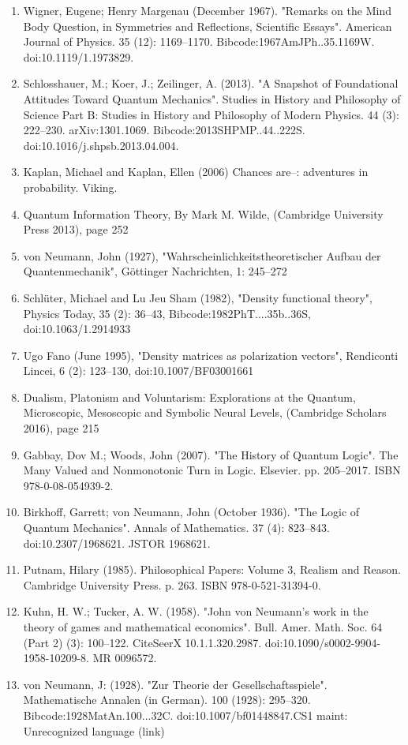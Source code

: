 \begin{enumerate}
\item Wigner, Eugene; Henry Margenau (December 1967). "Remarks on the Mind Body Question, in Symmetries and Reflections, Scientific Essays". American Journal of Physics. 35 (12): 1169–1170. Bibcode:1967AmJPh..35.1169W. doi:10.1119/1.1973829.
\item Schlosshauer, M.; Koer, J.; Zeilinger, A. (2013). "A Snapshot of Foundational Attitudes Toward Quantum Mechanics". Studies in History and Philosophy of Science Part B: Studies in History and Philosophy of Modern Physics. 44 (3): 222–230. arXiv:1301.1069. Bibcode:2013SHPMP..44..222S. doi:10.1016/j.shpsb.2013.04.004.
\item Kaplan, Michael and Kaplan, Ellen (2006) Chances are–: adventures in probability. Viking.
\item Quantum Information Theory, By Mark M. Wilde, (Cambridge University Press 2013), page 252
\item von Neumann, John (1927), "Wahrscheinlichkeitstheoretischer Aufbau der Quantenmechanik", Göttinger Nachrichten, 1: 245–272
\item Schlüter, Michael and Lu Jeu Sham (1982), "Density functional theory", Physics Today, 35 (2): 36–43, Bibcode:1982PhT....35b..36S, doi:10.1063/1.2914933
\item Ugo Fano (June 1995), "Density matrices as polarization vectors", Rendiconti Lincei, 6 (2): 123–130, doi:10.1007/BF03001661
\item Dualism, Platonism and Voluntarism: Explorations at the Quantum, Microscopic, Mesoscopic and Symbolic Neural Levels, (Cambridge Scholars 2016), page 215
\item Gabbay, Dov M.; Woods, John (2007). "The History of Quantum Logic". The Many Valued and Nonmonotonic Turn in Logic. Elsevier. pp. 205–2017. ISBN 978-0-08-054939-2.
\item Birkhoff, Garrett; von Neumann, John (October 1936). "The Logic of Quantum Mechanics". Annals of Mathematics. 37 (4): 823–843. doi:10.2307/1968621. JSTOR 1968621.
\item Putnam, Hilary (1985). Philosophical Papers: Volume 3, Realism and Reason. Cambridge University Press. p. 263. ISBN 978-0-521-31394-0.
\item Kuhn, H. W.; Tucker, A. W. (1958). "John von Neumann's work in the theory of games and mathematical economics". Bull. Amer. Math. Soc. 64 (Part 2) (3): 100–122. CiteSeerX 10.1.1.320.2987. doi:10.1090/s0002-9904-1958-10209-8. MR 0096572.
\item von Neumann, J: (1928). "Zur Theorie der Gesellschaftsspiele". Mathematische Annalen (in German). 100 (1928): 295–320. Bibcode:1928MatAn.100...32C. doi:10.1007/bf01448847.CS1 maint: Unrecognized language (link)

\end{enumerate}
